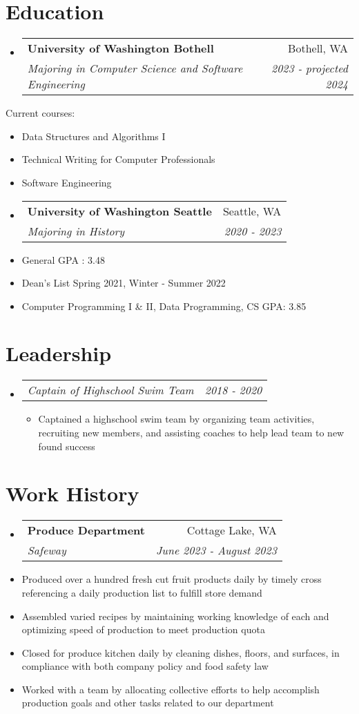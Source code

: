 \documentclass[letterpaper,11pt]{article}
\makeatletter
\newcommand{\resumeItem}[1]{
  \item\small{
    {#1 \vspace{-2pt}}
  }
}
\newcommand{\resumeSubheading}[4]{
  \vspace{-2pt}\item
    \begin{tabular*}{0.97\textwidth}[t]{l@{\extracolsep{\fill}}r}
      \textbf{#1} & #2 \\
      \textit{\small#3} & \textit{\small #4} \\
    \end{tabular*}\vspace{-7pt}
}
\newcommand{\resumeSubSubheading}[2]{
    \item
    \begin{tabular*}{0.97\textwidth}{l@{\extracolsep{\fill}}r}
      \textit{\small#1} & \textit{\small #2} \\
    \end{tabular*}\vspace{-7pt}
}
\newcommand{\resumeSubHeadingListStart}{\begin{itemize}[leftmargin=0.15in, label={}]}
\newcommand{\resumeSubHeadingListEnd}{\end{itemize}}
\newcommand{\resumeItemListStart}{\begin{itemize}}
\newcommand{\resumeItemListEnd}{\end{itemize}\vspace{-5pt}}
\makeatother
\begin{document}
\section{Education}
\resumeSubHeadingListStart
\resumeSubheading
  {University of Washington Bothell}{Bothell, WA}
  {Majoring in Computer Science and Software Engineering}
  {2023 - projected 2024}
\resumeSubHeadingListEnd
{Current courses:}
\resumeItemListStart
\resumeItem{Data Structures and Algorithms I}
\resumeItem{Technical Writing for Computer Professionals}
\resumeItem{Software Engineering}
\resumeItemListEnd
  \resumeSubHeadingListStart
    \resumeSubheading
      {University of Washington Seattle}{Seattle, WA}
      {Majoring in History}{2020 - 2023}
  \resumeSubHeadingListEnd
  \resumeItemListStart
    \resumeItem{General GPA : 3.48}
    \resumeItem{Dean's List Spring 2021, Winter - Summer 2022}
    \resumeItem{Computer Programming I \& II, Data Programming, CS GPA: 3.85}
  \resumeItemListEnd


\section{Leadership}
    \resumeSubHeadingListStart
        \resumeSubSubheading{Captain of Highschool Swim Team}{2018 - 2020}
          \resumeItemListStart
            \resumeItem{Captained a highschool swim team
            by organizing team activities, recruiting new members, and assisting
             coaches to help lead team to new found success}
          \resumeItemListEnd
    \resumeSubHeadingListEnd

\section{Work History}
\resumeSubHeadingListStart
  \resumeSubheading{Produce Department}{Cottage Lake, WA}{Safeway}{June 2023 - August 2023}
\resumeSubHeadingListEnd
\resumeItemListStart
 \resumeItem
 {
  Produced over a hundred fresh cut fruit products daily by timely cross referencing 
  a daily production list to fulfill store demand
 }
 \resumeItem
 {
  Assembled varied recipes by maintaining working knowledge of each and optimizing
  speed of production to meet production quota
 }
 \resumeItem
 {
  Closed for produce kitchen daily by cleaning dishes, floors, and surfaces, 
  in compliance with both company policy and food safety law
 }
 \resumeItem
 {
  Worked with a team by allocating collective efforts to help accomplish production
  goals and other tasks related to our department
 }
\resumeItemListEnd
\end{document}
